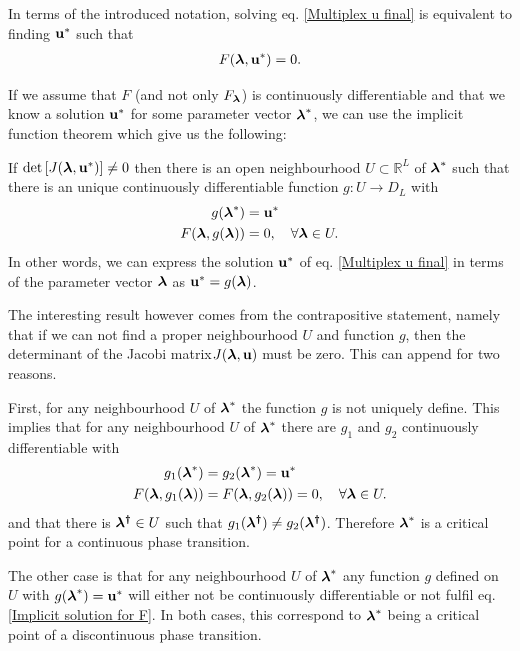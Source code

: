 \documentclass[
11pt, %
english, %
singlespacing, %
liststotoc, %
headsepline, %
]{MastersDoctoralThesis} %
\begin{document}
In terms of the introduced notation, solving eq. \eqref{Multiplex u final} is equivalent to finding $\boldsymbol{\mathrm{u}}^*$ such that
\begin{align}
	F(\boldsymbol{\mathrm{\lambda}}, \boldsymbol{\mathrm{u}}^*) = 0.
\end{align}

If we assume that $F$ (and not only $F_{\boldsymbol{\mathrm{\lambda}}}$) is continuously differentiable and that we know a solution $\boldsymbol{\mathrm{u}}^*$ for some parameter vector $\boldsymbol{\mathrm{\lambda}}^*$, we can use the implicit function theorem which give us the following:

If $\det\left[ J(\boldsymbol{\mathrm{\lambda}}, \boldsymbol{\mathrm{u}}^*) \right] \neq 0$ then there is an open neighbourhood $U \subset \mathbb{R}^L$ of $\boldsymbol{\mathrm{\lambda}}^*$ such that there is an unique continuously differentiable function $g : U \rightarrow D_L$ with
\begin{align}
	g(\boldsymbol{\mathrm{\lambda}}^*) &= \boldsymbol{\mathrm{u}}^* \\
	F(\boldsymbol{\mathrm{\lambda}}, g(\boldsymbol{\mathrm{\lambda}})) &= 0, \quad \forall \boldsymbol{\mathrm{\lambda}} \in U. \label{Implicit solution for F}
\end{align}
In other words, we can express the solution $\boldsymbol{\mathrm{u}}^*$ of eq. \eqref{Multiplex u final} in terms of the parameter vector $\boldsymbol{\mathrm{\lambda}}$ as $\boldsymbol{\mathrm{u}}^* = g(\boldsymbol{\mathrm{\lambda}})$.

The interesting result however comes from the contrapositive statement, namely that if we can not find a proper neighbourhood $U$ and function $g$, then the determinant of the Jacobi matrix$J(\boldsymbol{\mathrm{\lambda}}, \boldsymbol{\mathrm{u}})$ must be zero. This can append for two reasons.

First, for any neighbourhood $U$ of $\boldsymbol{\mathrm{\lambda}}^*$ the function $g$ is not uniquely define. This implies that for any neighbourhood $U$ of $\boldsymbol{\mathrm{\lambda}}^*$ there are  $g_1$ and $g_2$ continuously differentiable with
\begin{align}
	g_1(\boldsymbol{\mathrm{\lambda}}^*) &= g_2(\boldsymbol{\mathrm{\lambda}}^*) = \boldsymbol{\mathrm{u}}^* \\
	F(\boldsymbol{\mathrm{\lambda}}, g_1(\boldsymbol{\mathrm{\lambda}})) &= F(\boldsymbol{\mathrm{\lambda}}, g_2(\boldsymbol{\mathrm{\lambda}})) =  0, \quad \forall \boldsymbol{\mathrm{\lambda}} \in U.
\end{align}
and that there is $\boldsymbol{\mathrm{\lambda^\dagger}} \in U$ such that $g_1(\boldsymbol{\mathrm{\lambda^\dagger}}) \neq g_2(\boldsymbol{\mathrm{\lambda^\dagger}})$. Therefore $\boldsymbol{\mathrm{\lambda}}^*$ is a critical point for a continuous phase transition. 

The other case is that for any neighbourhood $U$ of $\boldsymbol{\mathrm{\lambda}}^*$ any function $g$ defined on $U$ with $g(\boldsymbol{\mathrm{\lambda}}^*) = \boldsymbol{\mathrm{u}}^*$ will either not be continuously differentiable or not fulfil eq. \eqref{Implicit solution for F}. In both cases, this correspond to $\boldsymbol{\mathrm{\lambda}}^*$ being a critical point of a discontinuous phase transition.
\end{document}
